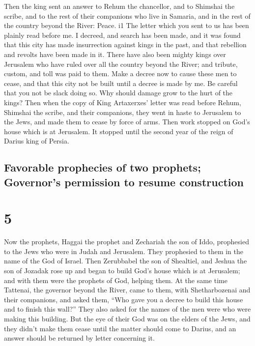  Then the king sent an answer to Rehum the chancellor,
and to Shimshai the scribe, and to the rest of their companions who live
in Samaria, and in the rest of the country beyond the River: Peace. i1
 The letter which you sent to us has been plainly read
before me.  I decreed, and search has been made, and it
was found that this city has made insurrection against kings in the
past, and that rebellion and revolts have been made in it.
 There have also been mighty kings over Jerusalem who
have ruled over all the country beyond the River; and tribute, custom,
and toll was paid to them.  Make a decree now to cause
these men to cease, and that this city not be built until a decree is
made by me.  Be careful that you not be slack doing so.
Why should damage grow to the hurt of the kings?  Then
when the copy of King Artaxerxes' letter was read before Rehum, Shimshai
the scribe, and their companions, they went in haste to Jerusalem to the
Jews, and made them to cease by force of arms.  Then work
stopped on God's house which is at Jerusalem. It stopped until the
second year of the reign of Darius king of Persia.

\hypertarget{favorable-prophecies-of-two-prophets-governors-permission-to-resume-construction}{%
\subsection{Favorable prophecies of two prophets; Governor's permission
to resume
construction}\label{favorable-prophecies-of-two-prophets-governors-permission-to-resume-construction}}

\hypertarget{section-4}{%
\section{5}\label{section-4}}

 Now the prophets, Haggai the prophet and Zechariah the
son of Iddo, prophesied to the Jews who were in Judah and Jerusalem.
They prophesied to them in the name of the God of Israel. 
Then Zerubbabel the son of Shealtiel, and Jeshua the son of Jozadak rose
up and began to build God's house which is at Jerusalem; and with them
were the prophets of God, helping them.  At the same time
Tattenai, the governor beyond the River, came to them, with
Shetharbozenai and their companions, and asked them, ``Who gave you a
decree to build this house and to finish this wall?'' 
They also asked for the names of the men were who were making this
building.  But the eye of their God was on the elders of
the Jews, and they didn't make them cease until the matter should come
to Darius, and an answer should be returned by letter concerning it.

